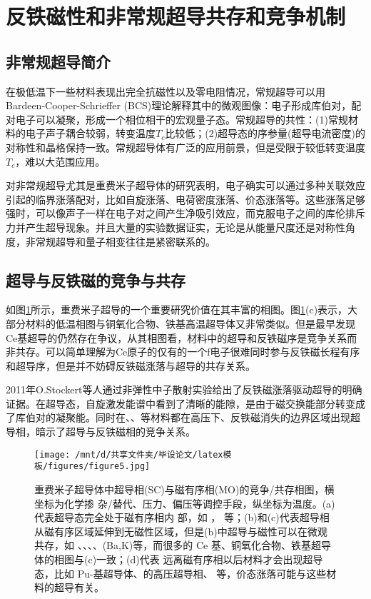\section{反铁磁性和非常规超导共存和竞争机制}%
\subsection{非常规超导简介}
在极低温下一些材料表现出完全抗磁性以及零电阻情况，常规超导可以用\\Bardeen-Cooper-Schrieffer (BCS)理论解释其中的微观图像：电子形成库伯对，配对电子可以凝聚，形成一个相位相干的宏观量子态。常规超导的共性：(1)常规材料的电子声子耦合较弱，转变温度$T_c$比较低；(2)超导态的序参量(超导电流密度)的对称性和晶格保持一致。常规超导体有广泛的应用前景，但是受限于较低转变温度$T_c$，难以大范围应用。

对非常规超导尤其是重费米子超导体的研究表明，电子确实可以通过多种关联效应引起的临界涨落配对，比如自旋涨落、电荷密度涨落、价态涨落等。这些涨落足够强时，可以像声子一样在电子对之间产生净吸引效应，而克服电子之间的库伦排斥力并产生超导现象。并且大量的实验数据证实，无论是从能量尺度还是对称性角度，非常规超导和量子相变往往是紧密联系的。
\subsection{超导与反铁磁的竞争与共存}
如图\ref{fig3}所示，重费米子超导的一个重要研究价值在其丰富的相图。图\ref{fig3}(c)表示，大部分材料的低温相图与铜氧化合物、铁基高温超导体又非常类似。但是最早发现Ce基超导的仍然存在争议，从其相图看，材料中的超导和反铁磁序是竞争关系而非共存。可以简单理解为Ce原子的仅有的一个f电子很难同时参与反铁磁长程有序和超导序，但是并不妨碍反铁磁涨落与超导的共存关系。

2011年O.Stockert等人通过非弹性中子散射实验给出了反铁磁涨落驱动超导的明确证据。在超导态，自旋激发能谱中看到了清晰的能隙，是由于磁交换能部分转变成了库伯对的凝聚能。同时在、、等材料都在高压下、反铁磁消失的边界区域出现超导相，暗示了超导与反铁磁相的竞争关系。



\begin{figure}[h]
    \texttt{[image: /mnt/d/共享文件夹/毕设论文/latex模板/figures/figure5.jpg]}
    \caption{重费米子超导体中超导相(SC)与磁有序相(MO)的竞争/共存相图，横坐标为化学掺 杂/替代、压力、偏压等调控手段，纵坐标为温度。(a)代表超导态完全处于磁有序相内 部，如 ， 等；(b)和(c)代表超导相从磁有序区域延伸到无磁性区域，但是(b)中超导与磁性可以在微观共存，如 、、、、(Ba,K)等，而很多的 Ce 基、铜氧化合物、铁基超导体的相图与(c)一致；(d)代表 远离磁有序相以后材料才会出现超导态，比如 Pu-基超导体、的高压超导相、 等，价态涨落可能与这些材料的超导有关\cite{9}。}
    \label{fig3}
\end{figure}

